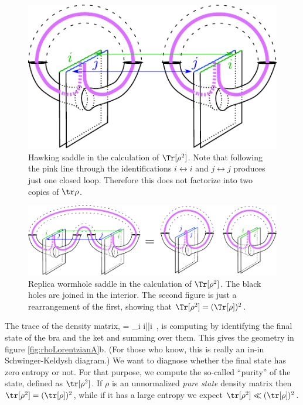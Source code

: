 \begin{figure}
\begin{center}
\includegraphics[scale=1]{figures/rhoLorentzianHawking.pdf}
\end{center}
\caption{\small Hawking saddle in the calculation of $\Tr[\rho^2]$. Note that following the pink line through the identifications $i \leftrightarrow i$ and $j \leftrightarrow j$ produces just one closed loop. Therefore this does not factorize into two copies of $\tr \rho$.\label{fig:rhoLorentzianHawking}}
\end{figure}

\begin{figure}
\begin{center}
\includegraphics[scale=0.95]{figures/rhoLorentzianWormhole.pdf}
\end{center}
\caption{\small Replica wormhole saddle in the calculation of $\Tr[\rho^2]$. The black holes are joined in the interior. The second figure is just a rearrangement of the first, showing that $\Tr[\rho^2] = (\Tr[\rho])^2$. \label{fig:rhoLorentzianWormhole}}
\end{figure}


  
 The trace of the density matrix, 
  \be
\tr \rho = \sum_{i} \langle i|\Psi\rangle\langle \Psi|i\rangle \ , 
  \ee
  is computing by identifying the final state of the bra and the ket and summing over them. This gives
  the geometry in figure \ref{fig:rhoLorentzianA}b. (For those who know, this is really an in-in Schwinger-Keldysh diagram.)
   We want to diagnose whether the final state has zero entropy or not. 
  For that purpose, we compute the so-called ``purity'' of the state, defined as $\tr[\rho^2]$. If $\rho$ is an unnormalized {\it pure state} density matrix then $\tr[\rho^2] = ( \tr[\rho])^2$, while if it has a large entropy we expect $ \tr[\rho^2 ]   \ll ( \tr[\rho])^2 $.
  
